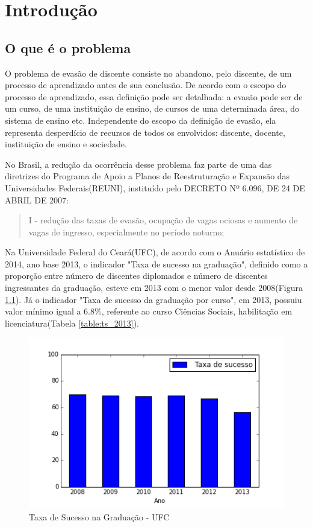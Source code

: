 \chapter{Introdução}

\section{O que é o problema}

O problema de evasão de discente consiste no abandono, pelo discente, de um processo de aprendizado antes de sua conclusão. De acordo com o escopo do processo de aprendizado, essa definição pode ser detalhada: a evasão pode ser de um curso, de uma instituição de ensino, de cursos de uma determinada área, do sistema de ensino etc. Independente do escopo da definição de evasão, ela representa desperdício de recursos de todos os envolvidos: discente, docente, instituição de ensino e sociedade.


No Brasil, a redução da ocorrência desse problema faz parte de uma das diretrizes do Programa de Apoio a Planos de Reestruturação e Expansão das Universidades Federais(REUNI), instituído pelo DECRETO Nº 6.096, DE 24 DE ABRIL DE 2007:

\begin{quote}
I - redução das taxas de evasão, ocupação de vagas ociosas e aumento de vagas de ingresso, especialmente no período noturno;
\end{quote}

Na Universidade Federal do Ceará(UFC), de acordo com o Anuário estatístico de 2014, ano base 2013, o indicador "Taxa de sucesso na graduação", definido como a proporção entre número de discentes diplomados e número de discentes ingressantes da graduação, esteve em 2013 com o menor valor desde 2008(Figura \ref{img:taxa-de-sucesso-ufc}). Já o indicador "Taxa de sucesso da graduação por curso", em 2013, possuiu valor mínimo igual a 6.8\%, referente ao curso Ciências Sociais, habilitação em licenciatura(Tabela \ref{table:ts_2013}).

\begin{figure}[H]
	\includegraphics[scale=0.8]{img/taxa-de-sucesso-ufc.png}
	\caption{Taxa de Sucesso na Graduação - UFC}
	\label{img:taxa-de-sucesso-ufc}
\end{figure}

